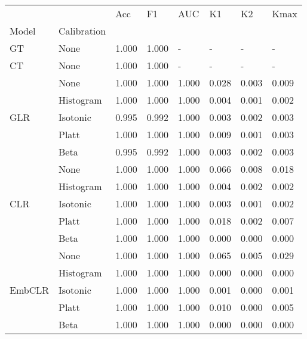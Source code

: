\begin{tabular}{llllllll}
\toprule
 &  & Acc & F1 & AUC & K1 & K2 & Kmax \\
Model & Calibration &  &  &  &  &  &  \\
\midrule
GT & None & 1.000 & 1.000 & - & - & - & - \\
\cline{1-8}
CT & None & 1.000 & 1.000 & - & - & - & - \\
\cline{1-8}
\multirow[t]{5}{*}{GLR} & None & 1.000 & 1.000 & 1.000 & 0.028 & 0.003 & 0.009 \\
 & Histogram & 1.000 & 1.000 & 1.000 & 0.004 & 0.001 & 0.002 \\
 & Isotonic & 0.995 & 0.992 & 1.000 & 0.003 & 0.002 & 0.003 \\
 & Platt & 1.000 & 1.000 & 1.000 & 0.009 & 0.001 & 0.003 \\
 & Beta & 0.995 & 0.992 & 1.000 & 0.003 & 0.002 & 0.003 \\
\cline{1-8}
\multirow[t]{5}{*}{CLR} & None & 1.000 & 1.000 & 1.000 & 0.066 & 0.008 & 0.018 \\
 & Histogram & 1.000 & 1.000 & 1.000 & 0.004 & 0.002 & 0.002 \\
 & Isotonic & 1.000 & 1.000 & 1.000 & 0.003 & 0.001 & 0.002 \\
 & Platt & 1.000 & 1.000 & 1.000 & 0.018 & 0.002 & 0.007 \\
 & Beta & 1.000 & 1.000 & 1.000 & 0.000 & 0.000 & 0.000 \\
\cline{1-8}
\multirow[t]{5}{*}{EmbCLR} & None & 1.000 & 1.000 & 1.000 & 0.065 & 0.005 & 0.029 \\
 & Histogram & 1.000 & 1.000 & 1.000 & 0.000 & 0.000 & 0.000 \\
 & Isotonic & 1.000 & 1.000 & 1.000 & 0.001 & 0.000 & 0.001 \\
 & Platt & 1.000 & 1.000 & 1.000 & 0.010 & 0.000 & 0.005 \\
 & Beta & 1.000 & 1.000 & 1.000 & 0.000 & 0.000 & 0.000 \\
\cline{1-8}
\bottomrule
\end{tabular}
